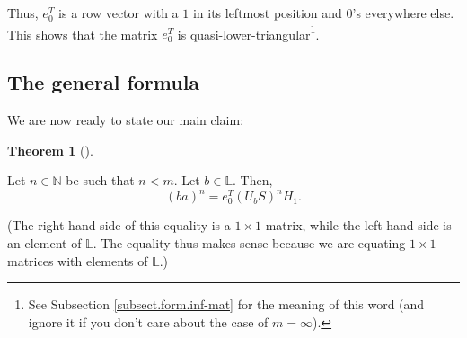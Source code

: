 \documentclass[numbers=enddot,12pt,final,onecolumn,notitlepage]{scrartcl}%
\theoremstyle{definition}
\newtheorem{theo}{Theorem}[section]
\newenvironment{theorem}[1][]
{\begin{theo}[#1]\begin{leftbar}}
{\end{leftbar}\end{theo}}
\begin{document}
Thus, $e_{0}^{T}$ is a row vector with a $1$ in its leftmost position and
$0$'s everywhere else. This shows that the matrix $e_{0}^{T}$ is
quasi-lower-triangular\footnote{See Subsection \ref{subsect.form.inf-mat} for
the meaning of this word (and ignore it if you don't care about the case of
$m=\infty$).}.

\subsection{\label{subsect.form.thm}The general formula}

We are now ready to state our main claim:

\begin{theorem}
\label{thm.gen}Let $n\in\mathbb{N}$ be such that $n<m$. Let $b\in\mathbb{L}$.
Then,%
\[
\left(  ba\right)  ^{n}=e_{0}^{T}\left(  U_{b}S\right)  ^{n}H_{1}.
\]

\end{theorem}

(The right hand side of this equality is a $1\times1$-matrix, while the left
hand side is an element of $\mathbb{L}$. The equality thus makes sense because
we are equating $1\times1$-matrices with elements of $\mathbb{L}$.)
\end{document}
